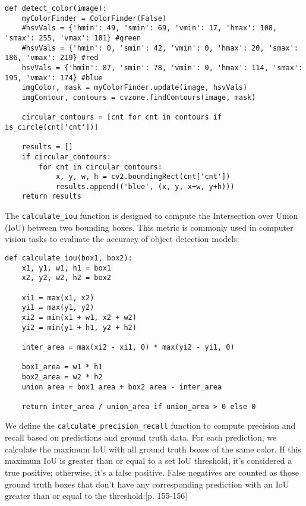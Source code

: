 \begin{lstlisting}[language=PythonPlus]
def detect_color(image):
    myColorFinder = ColorFinder(False)
    #hsvVals = {'hmin': 49, 'smin': 69, 'vmin': 17, 'hmax': 108, 'smax': 255, 'vmax': 181} #green
    #hsvVals = {'hmin': 0, 'smin': 42, 'vmin': 0, 'hmax': 20, 'smax': 186, 'vmax': 219} #red
    hsvVals = {'hmin': 87, 'smin': 78, 'vmin': 0, 'hmax': 114, 'smax': 195, 'vmax': 174} #blue
    imgColor, mask = myColorFinder.update(image, hsvVals)
    imgContour, contours = cvzone.findContours(image, mask)

    circular_contours = [cnt for cnt in contours if is_circle(cnt['cnt'])]

    results = []
    if circular_contours:
        for cnt in circular_contours:
            x, y, w, h = cv2.boundingRect(cnt['cnt'])
            results.append(('blue', (x, y, x+w, y+h)))
    return results
\end{lstlisting}
\newpage
The \verb|calculate_iou| function is designed to compute the Intersection over Union (IoU) between two bounding boxes. This metric is commonly used in computer vision tasks to evaluate the accuracy of object detection models: \cite{IoUdoc}

\begin{lstlisting}[language=PythonPlus]
def calculate_iou(box1, box2):
    x1, y1, w1, h1 = box1
    x2, y2, w2, h2 = box2

    xi1 = max(x1, x2)
    yi1 = max(y1, y2)
    xi2 = min(x1 + w1, x2 + w2)
    yi2 = min(y1 + h1, y2 + h2)

    inter_area = max(xi2 - xi1, 0) * max(yi2 - yi1, 0)

    box1_area = w1 * h1
    box2_area = w2 * h2
    union_area = box1_area + box2_area - inter_area

    return inter_area / union_area if union_area > 0 else 0
\end{lstlisting}
\newpage
We define the \verb|calculate_precision_recall| function to compute precision and recall based on predictions and ground truth data. For each prediction, we calculate the maximum IoU with all ground truth boxes of the same color. If this maximum IoU is greater than or equal to a set IoU threshold, it's considered a true positive; otherwise, it's a false positive. False negatives are counted as those ground truth boxes that don't have any corresponding prediction with an IoU greater than or equal to the threshold:\cite{preandrec}[p. 155-156]

